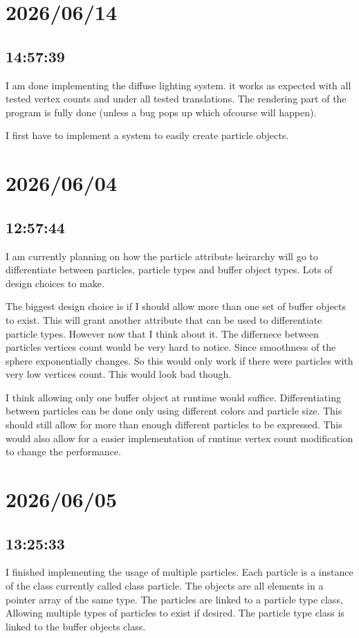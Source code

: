\documentclass{article}
\begin{document}
\section*{2026/06/14}
\subsection{14:57:39}
I am done implementing the diffuse lighting system. it works as expected with all tested vertex counts and
under all tested translations. The rendering part of the program is fully done (unless a bug pops up which
ofcourse will happen). 

I first have to implement a system to easily create particle objects.  

\section*{2026/06/04}
\subsection*{12:57:44}
I am currently planning on how the particle attribute heirarchy will go to differentiate between particles, 
particle types and buffer object types. Lots of design choices to make.

The biggest design choice is if I should allow more than one set of buffer objects to exist. This will 
grant another attribute that can be used to differentiate particle types. However now that I think 
about it. The differnece between particles vertices count would be very hard to notice. Since smoothness
of the sphere exponentially changes. So this would only work if there were particles with very low 
vertices count. This would look bad though. 

I think allowing only one buffer object at runtime would suffice. Differentiating between particles can
be done only using different colors and particle size. This should still allow for more than enough 
different particles to be expressed. This would also allow for a easier implementation of runtime
vertex count modification to change the performance.

\section*{2026/06/05}
\subsection*{13:25:33}
I finished implementing the usage of multiple particles. Each particle is a instance of the class
currently called class particle. The objects are all elements in a pointer array of the same type.
The particles are linked to a particle type class, Allowing multiple types of particles to exist if
desired. The particle type class is linked to the buffer objects class.
\end{document}
